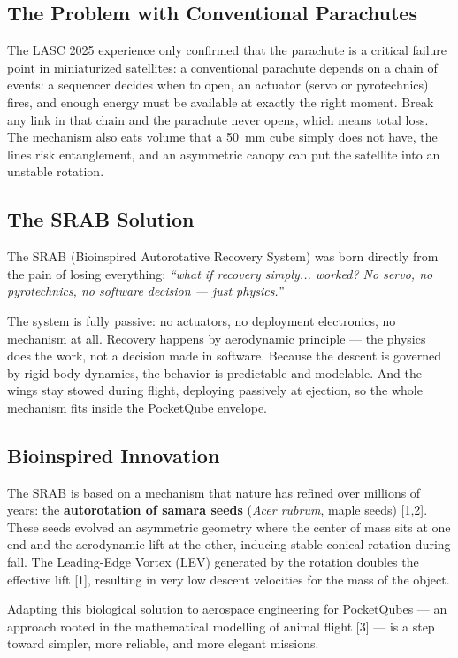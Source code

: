 \subsection{The Problem with Conventional Parachutes}

The LASC 2025 experience only confirmed that the parachute is a
critical failure point in miniaturized satellites: a conventional
parachute depends on a chain of events: a
sequencer decides when to open, an actuator (servo or pyrotechnics)
fires, and enough energy must be available at exactly the right
moment. Break any link in that chain and the parachute never opens,
which means total loss. The mechanism also eats volume that a 50~mm
cube simply does not have, the lines risk entanglement, and an
asymmetric canopy can put the satellite into an unstable rotation.

\subsection{The SRAB Solution}

The SRAB (Bioinspired Autorotative Recovery System) was born directly
from the pain of losing everything: \emph{``what if recovery simply...
worked? No servo, no pyrotechnics, no software decision — just
physics.''}

The system is fully passive: no actuators, no deployment electronics,
no mechanism at all. Recovery happens by aerodynamic principle — the
physics does the work, not a decision made in software. Because the
descent is governed by rigid-body dynamics, the behavior is
predictable and modelable. And the wings stay stowed during flight,
deploying passively at ejection, so the whole mechanism fits inside
the PocketQube envelope.

\subsection{Bioinspired Innovation}

The SRAB is based on a mechanism that nature has refined over millions
of years: the \textbf{autorotation of samara seeds} (\emph{Acer
rubrum}, maple seeds) [1,2]. These seeds evolved an asymmetric geometry
where the center of mass sits at one end and the aerodynamic lift at
the other, inducing stable conical rotation during fall. The
Leading-Edge Vortex (LEV) generated by the rotation doubles the
effective lift [1], resulting in very low descent velocities for the
mass of the object.

Adapting this biological solution to aerospace engineering for
PocketQubes --- an approach rooted in the mathematical modelling of
animal flight [3] --- is a step toward simpler, more reliable, and more
elegant missions.

